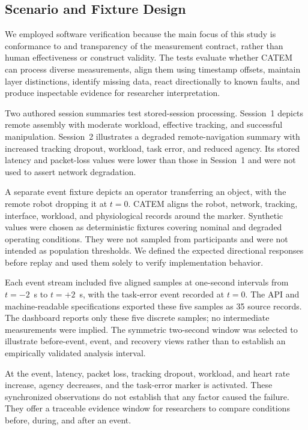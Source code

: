 \documentclass[letterpaper,10pt,conference]{ieeeconf}
\begin{document}
\subsection{Scenario and Fixture Design}

We employed software verification because the main focus of this study is conformance to and transparency of the measurement contract, rather than human effectiveness or construct validity. The tests evaluate whether CATEM can process diverse measurements, align them using timestamp offsets, maintain layer distinctions, identify missing data, react directionally to known faults, and produce inspectable evidence for researcher interpretation.

Two authored session summaries test stored-session processing. Session~1 depicts remote assembly with moderate workload, effective tracking, and successful manipulation. Session~2 illustrates a degraded remote-navigation summary with increased tracking dropout, workload, task error, and reduced agency. Its stored latency and packet-loss values were lower than those in Session~1 and were not used to assert network degradation.

A separate event fixture depicts an operator transferring an object, with the remote robot dropping it at $t=0$. CATEM aligns the robot, network, tracking, interface, workload, and physiological records around the marker. Synthetic values were chosen as deterministic fixtures covering nominal and degraded operating conditions. They were not sampled from participants and were not intended as population thresholds. We defined the expected directional responses before replay and used them solely to verify implementation behavior.

Each event stream included five aligned samples at one-second intervals from $t=-2$~s to $t=+2$~s, with the task-error event recorded at $t=0$. The API and machine-readable specifications exported these five samples as 35 source records. The dashboard reports only these five discrete samples; no intermediate measurements were implied. The symmetric two-second window was selected to illustrate before-event, event, and recovery views rather than to establish an empirically validated analysis interval.

At the event, latency, packet loss, tracking dropout, workload, and heart rate increase, agency decreases, and the task-error marker is activated. These synchronized observations do not establish that any factor caused the failure. They offer a traceable evidence window for researchers to compare conditions before, during, and after an event.
\end{document}
